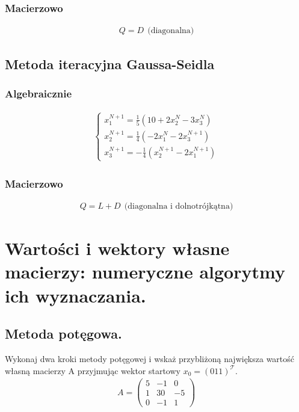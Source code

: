 \documentclass[main.tex]{subfiles}
\begin{document}
    \subsubsection{Macierzowo}
    \begin{align*}
        Q = D ~~ \text{(diagonalna)}
    \end{align*}

    \subsection{Metoda iteracyjna Gaussa-Seidla}
    \subsubsection{Algebraicznie}
    \begin{align*}
        \left\{\begin{matrix}
                   x^{N+1}_1 = \frac{1}{5}(10 + 2x^N_2 - 3x^N_3)\\
                   x^{N+1}_2 = \frac{1}{4}(-2x^N_1 - 2x^{N+1}_3)\\
                   x^{N+1}_3 = -\frac{1}{4}(x^{N+1}_2 - 2x^{N+1}_1)
        \end{matrix}\right.
    \end{align*}

    \subsubsection{Macierzowo}
    \begin{align*}
        Q = L + D ~~ \text{(diagonalna i dolnotrójkątna)}
    \end{align*}


    \newpage

    \section{Wartości i wektory własne macierzy: numeryczne algorytmy ich wyznaczania.}

    \subsection{Metoda potęgowa.}

    \begin{exercise}
        Wykonaj dwa kroki metody potęgowej i wskaż przybliżoną największa wartość własną macierzy A przyjmując
        wektor startowy $x_0 = (0 1 1)^\mathcal{T}$.
        \begin{align*}
            A = \begin{pmatrix}
                    5 & -1 & 0\\
                    1 & 30 & -5\\
                    0 & -1 & 1
            \end{pmatrix}
        \end{align*}
    \end{exercise}
\end{document}
